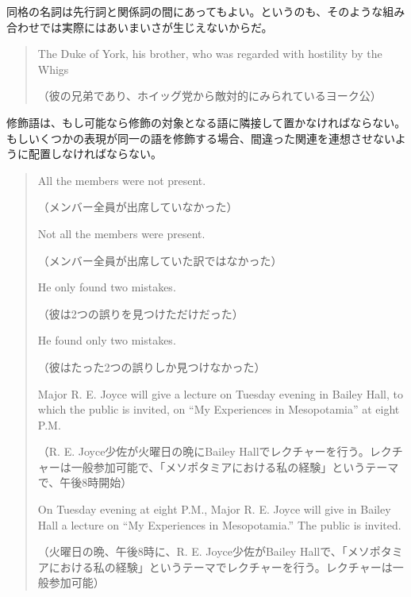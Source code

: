 同格の名詞は先行詞と関係詞の間にあってもよい。というのも、そのような組み合わせでは実際にはあいまいさが生じえないからだ。
\begin{quote}
    The Duke of York, his brother, who was regarded with hostility by
the Whigs

（彼の兄弟であり、ホイッグ党から敵対的にみられているヨーク公）
\end{quote}
修飾語は、もし可能なら修飾の対象となる語に隣接して置かなければならない。もしいくつかの表現が同一の語を修飾する場合、間違った関連を連想させないように配置しなければならない。
\begin{quote}
    All the members were not present.
    
    （メンバー全員が出席していなかった）
    
    Not all the members were present.
    
    （メンバー全員が出席していた訳ではなかった）
    
    He only found two mistakes.
    
    （彼は2つの誤りを見つけただけだった）
    
    
    He found only two mistakes.
    
    （彼はたった2つの誤りしか見つけなかった）
    
    Major R. E. Joyce will give a lecture on Tuesday evening in Bailey
Hall, to which the public is invited, on ``My Experiences in
Mesopotamia'' at eight P.M.

（R. E. Joyce少佐が火曜日の晩にBailey
Hallでレクチャーを行う。レクチャーは一般参加可能で、「メソポタミアにおける私の経験」というテーマで、午後8時開始）

On Tuesday evening at eight P.M., Major R. E. Joyce will give in
Bailey Hall a lecture on ``My Experiences in Mesopotamia.'' The public
is invited.

（火曜日の晩、午後8時に、R. E. Joyce少佐がBailey
Hallで、「メソポタミアにおける私の経験」というテーマでレクチャーを行う。レクチャーは一般参加可能）
\end{quote}
